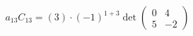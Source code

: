 \documentclass[preview]{standalone}
\begin{document}
\begin{align*}
a_{13}C_{13} = (3) \cdot (-1)^{1+3} \det\begin{pmatrix} 0 & 4 \\ 5 & -2 \end{pmatrix}
\end{align*}
\end{document}
